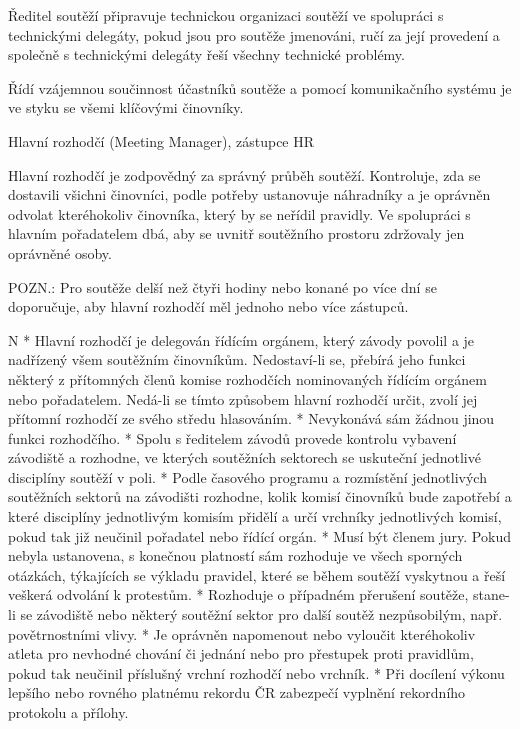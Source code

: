 Ředitel soutěží připravuje technickou organizaci soutěží ve spolupráci s technickými delegáty, pokud jsou pro soutěže jmenováni, ručí za její provedení a společně s technickými delegáty řeší všechny technické problémy.

Řídí vzájemnou součinnost účastníků soutěže a pomocí komunikačního systému je ve styku se všemi klíčovými činovníky.

\secc Hlavní rozhodčí (Meeting Manager), zástupce HR

Hlavní rozhodčí je zodpovědný za správný průběh soutěží.
Kontroluje, zda se dostavili všichni činovníci, podle potřeby ustanovuje náhradníky a je oprávněn odvolat kteréhokoliv činovníka, který by se neřídil pravidly.
Ve spolupráci s hlavním pořadatelem dbá, aby se uvnitř soutěžního prostoru zdržovaly jen oprávněné osoby.

POZN.: Pro soutěže delší než čtyři hodiny nebo konané po více dní se doporučuje, aby hlavní rozhodčí měl jednoho nebo více zástupců.

\begitems \style N 
* Hlavní rozhodčí je delegován řídícím orgánem, který závody povolil a je nadřízený všem soutěžním činovníkům. Nedostaví-li se, přebírá jeho funkci některý z přítomných členů komise rozhodčích nominovaných řídícím orgánem nebo pořadatelem. Nedá-li se tímto způsobem hlavní rozhodčí určit, zvolí jej přítomní rozhodčí ze svého středu hlasováním.
* Nevykonává sám žádnou jinou funkci rozhodčího.
* Spolu s ředitelem závodů provede kontrolu vybavení závodiště a rozhodne, ve kterých soutěžních sektorech se uskuteční jednotlivé disciplíny soutěží v poli.
* Podle časového programu a rozmístění jednotlivých soutěžních sektorů na závodišti rozhodne, kolik komisí činovníků bude zapotřebí a které disciplíny jednotlivým komisím přidělí a určí vrchníky jednotlivých komisí, pokud tak již neučinil pořadatel nebo řídící orgán.
* Musí být členem jury. Pokud nebyla ustanovena, s konečnou platností sám rozhoduje ve všech sporných otázkách, týkajících se výkladu pravidel, které se během soutěží vyskytnou a řeší veškerá odvolání k protestům.
* Rozhoduje o případném přerušení soutěže, stane-li se závodiště nebo některý soutěžní sektor pro další soutěž nezpůsobilým, např. povětrnostními vlivy.
* Je oprávněn napomenout nebo vyloučit kteréhokoliv atleta pro nevhodné chování či jednání nebo pro přestupek proti pravidlům, pokud tak neučinil příslušný vrchní rozhodčí nebo vrchník.
* Při docílení výkonu lepšího nebo rovného platnému rekordu ČR zabezpečí vyplnění rekordního protokolu a přílohy.

